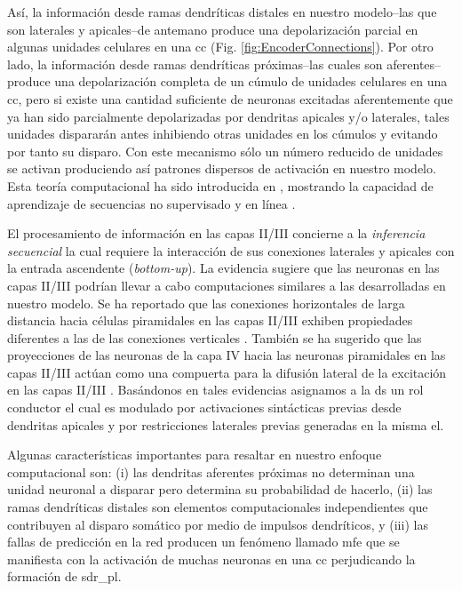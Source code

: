 {Así, la información desde ramas dendríticas distales en nuestro modelo--las que son laterales y apicales--de antemano produce una depolarización parcial en algunas unidades celulares en una \gls{cc} (Fig. \ref{fig:EncoderConnections}).
Por otro lado, la información desde ramas dendríticas próximas--las cuales son aferentes--produce una depolarización completa de un cúmulo de unidades celulares en una \gls{cc}, pero si existe una cantidad suficiente de neuronas excitadas aferentemente que ya han sido parcialmente depolarizadas por dendritas apicales y/o laterales, tales unidades dispararán antes inhibiendo otras unidades en los cúmulos y evitando por tanto su disparo.
Con este mecanismo sólo un número reducido de unidades se activan produciendo así patrones dispersos de activación en nuestro modelo.
Esta teoría computacional ha sido introducida en \cite{10.3389/fncir.2016.00023}, mostrando la capacidad de aprendizaje de secuencias no supervisado y en línea \cite{Cui:2016:COS:3030654.3030660}.

El procesamiento de información en las capas II/III concierne a la \emph{inferencia secuencial} la cual requiere la interacción de sus conexiones laterales y apicales con la entrada ascendente (\emph{bottom-up}).
La evidencia sugiere que las neuronas en las capas II/III podrían llevar a cabo computaciones similares a las desarrolladas en nuestro modelo. Se ha reportado que las conexiones horizontales de larga distancia hacia células piramidales en las capas II/III exhiben propiedades diferentes a las de las conexiones verticales \cite{Yoshimura1931}.
También se ha sugerido que las proyecciones de las neuronas de la capa IV hacia las neuronas piramidales en las capas II/III actúan como una compuerta para la difusión lateral de la excitación en las capas II/III \cite{doi:10.1113/jphysiol.2001.012959}.
Basándonos en tales evidencias asignamos a la \gls{ds} un rol conductor el cual es modulado por activaciones sintácticas previas desde dendritas apicales y por restricciones laterales previas generadas en la misma \gls{el}.

Algunas características importantes para resaltar en nuestro enfoque computacional \cite{10.1371/journal.pone.0217966} son: (i) las dendritas aferentes próximas no determinan una unidad neuronal a disparar pero determina su probabilidad de hacerlo, (ii) las ramas dendríticas distales son elementos computacionales independientes que contribuyen al disparo somático por medio de impulsos dendríticos, y (iii) las fallas de predicción en la red producen un fenómeno llamado \gls{mfe} que se manifiesta con la activación de muchas neuronas en una \gls{cc} perjudicando la formación de \gls{sdr_pl}.

}
